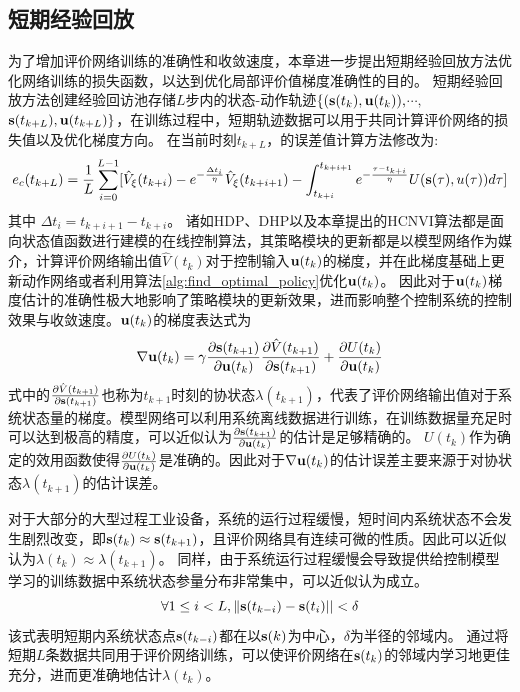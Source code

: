 \subsection{短期经验回放}
为了增加评价网络训练的准确性和收敛速度，本章进一步提出短期经验回放方法优化网络训练的损失函数，以达到优化局部评价值梯度准确性的目的。
短期经验回放方法创建经验回访池存储$L$步内的状态-动作轨迹$\{(\mathbf s(t_k), \mathbf u(t_k))\text{,}$$\cdots \text{,}$$\mathbf s(t_{k+L}), \mathbf u(t_{k+L})\}$，在训练过程中，短期轨迹数据可以用于共同计算评价网络的损失值以及优化梯度方向。
在当前时刻$t_{k+L}$，的误差值计算方法修改为:
\begin{equation}
  e_{c }(t_{k+L})=\frac{1}{L}\sum_{i=0}^{L-1}[\hat{V}_{\xi}(t_{k+i})-e^{-\frac{\Delta t_i}{\eta}} \hat{V}_{\xi}(t_{k+i+1})-\int_{t_{k+i}}^{t_{k+i+1}}e^{-\frac{\tau-t_{k+i}}{\eta}}U(\mathbf s(\tau), u(\tau))d \tau]
  \label{equ:TDerror_replay}
  \end{equation}
  其中 $\Delta t_i = t_{k+i+1}-t_{k+i}$。
诸如HDP、DHP以及本章提出的HCNVI算法都是面向状态值函数进行建模的在线控制算法，其策略模块的更新都是以模型网络作为媒介，计算评价网络输出值$\hat{V}(t_k)$对于控制输入${\mathbf
u}(t_k)$的梯度，并在此梯度基础上更新动作网络或者利用算法\ref{alg:find_optimal_policy}优化${\mathbf u}(t_k)$。
因此对于${\mathbf u}(t_k)$梯度估计的准确性极大地影响了策略模块的更新效果，进而影响整个控制系统的控制效果与收敛速度。${\mathbf u}(t_k)$的梯度表达式为
\begin{equation}
\label{equ:uk_grad} \nabla \mathbf u(t_k)=\gamma\frac{\partial \mathbf s(t_{k+1})}{\partial \mathbf u(t_k)}\frac{\partial\hat{V}(t_{k+1})}{\partial \mathbf s(t_{k+1})}+\frac{\partial U(t_k)}{\partial \mathbf u(t_k)}
\end{equation}
式中的$\frac{\partial\hat{V}(t_{k+1})}{\partial \mathbf
s(t_{k+1})}$也称为$t_{k+1}$时刻的协状态$\lambda(t_{k+1})$，代表了评价网络输出值对于系统状态量的梯度。模型网络可以利用系统离线数据进行训练，在训练数据量充足时可以达到极高的精度，可以近似认为$\frac{\partial
\mathbf s(t_{k+1})}{\partial \mathbf u(t_k)}$的估计是足够精确的。
$U(t_k)$作为确定的效用函数使得$\frac{\partial U(t_k)}{\partial \mathbf
u(t_k)}$是准确的。因此对于$\nabla \mathbf
u(t_k)$的估计误差主要来源于对协状态$\lambda(t_{k+1})$的估计误差。

对于大部分的大型过程工业设备，系统的运行过程缓慢，短时间内系统状态不会发生剧烈改变，即$\mathbf s(t_k)\approx \mathbf s(t_{k+1})$，且评价网络具有连续可微的性质。因此可以近似认为$\lambda(t_k)\approx \lambda(t_{k+1})$。
同样，由于系统运行过程缓慢会导致提供给控制模型学习的训练数据中系统状态参量分布非常集中，可以近似认为成立。
\begin{equation}
\label{equ:x_equation} \forall 1 \leq i<L, \| \mathbf s(t_{k-i})-\mathbf s(t_i)||<\delta
\end{equation}
该式表明短期内系统状态点$\mathbf s(t_{k-i})$都在以$\mathbf s(k)$为中心，$\delta$为半径的邻域内。
通过将短期$L$条数据共同用于评价网络训练，可以使评价网络在$\mathbf s(t_k)$的邻域内学习地更佳充分，进而更准确地估计$\lambda(t_k)$。

